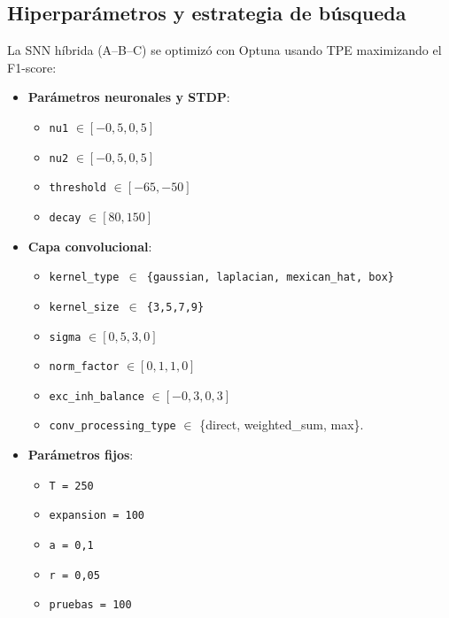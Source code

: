 \subsection{Hiperparámetros y estrategia de búsqueda}
La SNN híbrida (A--B--C) se optimizó con Optuna usando TPE maximizando el F1-score:
\begin{itemize}
    \item \textbf{Parámetros neuronales y STDP}:
    \begin{itemize}
        \item \texttt{nu1} \(\in [-0{,}5, 0{,}5]\)
        \item \texttt{nu2} \(\in [-0{,}5, 0{,}5]\)
        \item \texttt{threshold} \(\in [-65, -50]\)
        \item \texttt{decay} \(\in [80, 150]\)
    \end{itemize}
    \item \textbf{Capa convolucional}:
    \begin{itemize}
        \item \texttt{kernel\_type \(\in\) \{gaussian, laplacian, mexican\_hat, box\}}
        \item \texttt{kernel\_size \(\in\) \{3,5,7,9\}}
        \item \texttt{sigma} \(\in [0{,}5, 3{,}0]\)
        \item \texttt{norm\_factor} \(\in [0{,}1, 1{,}0]\)
        \item \texttt{exc\_inh\_balance} \(\in [-0{,}3, 0{,}3]\)
        \item \texttt{conv\_processing\_type} \(\in\) \{direct, weighted\_sum, max\}.
    \end{itemize}
    \item \textbf{Parámetros fijos}: 
     \begin{itemize}
        \item  \texttt{T = 250}
        \item \texttt{expansion = 100}
        \item \texttt{a = 0{,}1}
        \item \texttt{r = 0{,}05}
        \item \texttt{pruebas = 100}
    \end{itemize}
\end{itemize}
